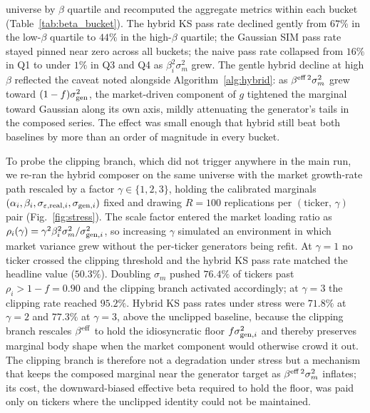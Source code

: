 universe by $\beta$ quartile and recomputed the aggregate metrics
within each bucket (Table~\ref{tab:beta_bucket}). The hybrid KS pass
rate declined gently from $67\%$ in the low-$\beta$ quartile to $44\%$
in the high-$\beta$ quartile; the Gaussian SIM pass rate stayed pinned
near zero across all buckets; the naive pass rate collapsed from
$16\%$ in Q1 to under $1\%$ in Q3 and Q4 as $\beta_i^2 \sigma_m^2$
grew. The gentle hybrid decline at high $\beta$ reflected the caveat
noted alongside Algorithm~\ref{alg:hybrid}: as
$\beta^{\mathrm{eff}\,2}\sigma_m^2$ grew toward $(1 - f)\sigma_{\mathrm{gen}}^2$, the
market-driven component of $g$ tightened the marginal toward Gaussian
along its own axis, mildly attenuating the generator's tails in the
composed series. The effect was small enough that hybrid still beat
both baselines by more than an order of magnitude in every bucket.

To probe the clipping branch, which did not trigger anywhere in the
main run, we re-ran the hybrid composer on the same universe with the
market growth-rate path rescaled by a factor
$\gamma \in \{1, 2, 3\}$, holding the calibrated marginals
$(\alpha_i, \beta_i, \sigma_{\varepsilon,\mathrm{real},i}, \sigma_{\mathrm{gen},i})$ fixed and
drawing $R = 100$ replications per $(\mathrm{ticker},\, \gamma)$ pair
(Fig.~\ref{fig:stress}). The scale factor entered the market loading
ratio as $\rho_i(\gamma) = \gamma^2 \beta_i^2 \sigma_m^2 /
\sigma_{\mathrm{gen},i}^2$, so increasing $\gamma$ simulated an environment in
which market variance grew without the per-ticker generators being
refit. At $\gamma = 1$ no ticker crossed the clipping threshold and the
hybrid KS pass rate matched the headline value ($50.3\%$). Doubling
$\sigma_m$ pushed $76.4\%$ of tickers past $\rho_i > 1 - f = 0.90$ and
the clipping branch activated accordingly; at $\gamma = 3$ the clipping
rate reached $95.2\%$. Hybrid KS pass rates under stress were $71.8\%$
at $\gamma = 2$ and $77.3\%$ at $\gamma = 3$, above the unclipped
baseline, because the clipping branch rescales $\beta^{\mathrm{eff}}$ to hold
the idiosyncratic floor $f \sigma_{\mathrm{gen},i}^2$ and thereby preserves
marginal body shape when the market component would otherwise crowd it
out. The clipping branch is therefore not a degradation under stress
but a mechanism that keeps the composed marginal near the generator
target as $\beta^{\mathrm{eff}\,2}\sigma_m^2$ inflates; its cost, the
downward-biased effective beta required to hold the floor, was paid
only on tickers where the unclipped identity could not be maintained.

